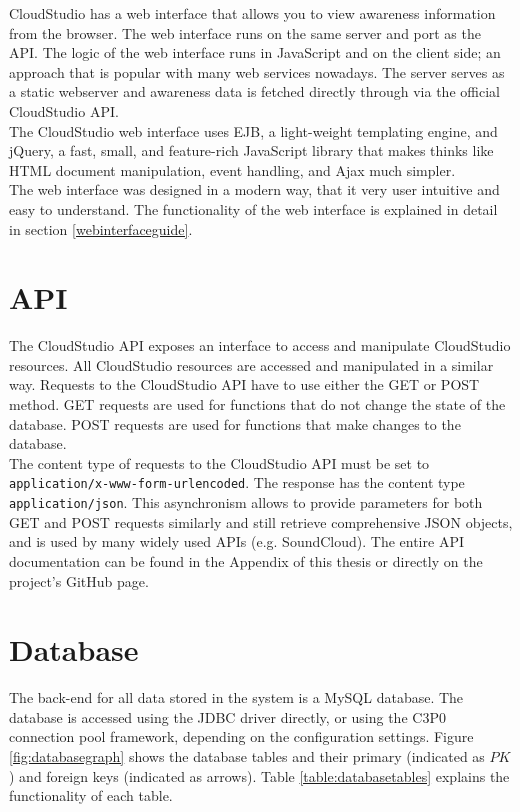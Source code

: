 CloudStudio has a web interface that allows you to view awareness information from the browser. The web interface runs on the same server and port as the API. The logic of the web interface runs in JavaScript and on the client side; an approach that is popular with many web services nowadays. The server serves as a static webserver and awareness data is fetched directly through via the official CloudStudio API. \\

The CloudStudio web interface uses EJB, a light-weight templating engine, and jQuery, a fast, small, and feature-rich JavaScript library that makes thinks like HTML document manipulation, event handling, and Ajax much simpler. \\

The web interface was designed in a modern way, that it very user intuitive and easy to understand. The functionality of the web interface is explained in detail in section \ref{webinterfaceguide}.



\section{API}

The CloudStudio API exposes an interface to access and manipulate CloudStudio resources. All CloudStudio resources are accessed and manipulated in a similar way. Requests to the CloudStudio API have to use either the GET or POST method. GET requests are used for functions that do not change the state of the database. POST requests are used for functions that make changes to the database. \\

The content type of requests to the CloudStudio API must be set to \texttt{application/x-www-form-urlencoded}. The response has the content type \texttt{application/json}. This asynchronism allows to provide parameters for both GET and POST requests similarly and still retrieve comprehensive JSON objects, and is used by many widely used APIs (e.g. SoundCloud). The entire API documentation can be found in the Appendix of this thesis or directly on the project's GitHub page.



\section{Database}\label{database}

The back-end for all data stored in the system is a MySQL database. The database is accessed using the JDBC driver directly, or using the C3P0 connection pool framework, depending on the configuration settings. Figure \ref{fig:databasegraph} shows the database tables and their primary (indicated as $PK$) and foreign keys (indicated as arrows). Table \ref{table:databasetables} explains the functionality of each table.


